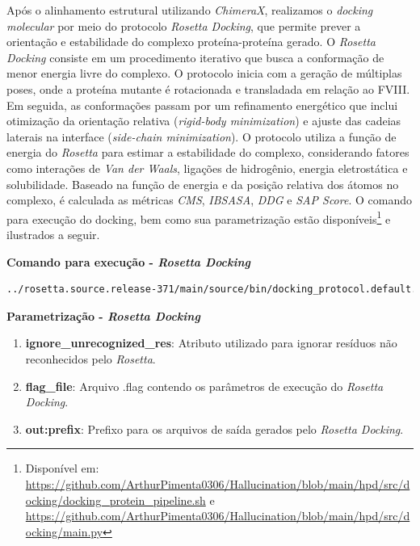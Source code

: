 Após o alinhamento estrutural utilizando \textit{ChimeraX}, realizamos o \textit{docking molecular} 
por meio do protocolo \textit{Rosetta Docking}, 
que permite prever a orientação e estabilidade do complexo proteína-proteína gerado.
O \textit{Rosetta Docking} consiste em um procedimento iterativo que busca a conformação de menor energia livre do complexo.
O protocolo inicia com a geração de múltiplas poses, onde a proteína mutante é rotacionada e transladada em relação ao FVIII.
Em seguida, as conformações passam por um refinamento energético que inclui otimização da 
orientação relativa (\textit{rigid-body minimization}) e ajuste das cadeias laterais na interface 
(\textit{side-chain minimization}). 
O protocolo utiliza a função de energia do \textit{Rosetta} para estimar a estabilidade do complexo,
considerando fatores como interações de \textit{Van der Waals}, 
ligações de hidrogênio, energia eletrostática e solubilidade.
Baseado na função de energia e da posição relativa dos átomos no complexo, 
é calculada as métricas \textit{CMS}, \textit{IBSASA}, 
\textit{DDG} e \textit{SAP Score}.
O comando para execução do docking, 
bem como sua parametrização 
estão disponíveis\footnote{Disponível em: \url{https://github.com/ArthurPimenta0306/Hallucination/blob/main/hpd/src/docking/docking_protein_pipeline.sh} e \url{https://github.com/ArthurPimenta0306/Hallucination/blob/main/hpd/src/docking/main.py}}
e ilustrados a seguir.

\textbf{Comando para execução - \textit{Rosetta Docking}}
\begin{lstlisting}[language=bash, breaklines=true, frame=single, backgroundcolor=\color{lightgray}]
  ../rosetta.source.release-371/main/source/bin/docking_protocol.default.macosclangrelease -ignore_unrecognized_res @flag_file -out:prefix process_1_
\end{lstlisting}

\textbf{Parametrização - \textit{Rosetta Docking}}
\begin{enumerate}
    \item \textbf{ignore\_unrecognized\_res}: Atributo utilizado para ignorar resíduos não reconhecidos pelo \textit{Rosetta}.
    \item \textbf{flag\_file}: Arquivo .flag contendo os parâmetros de execução do \textit{Rosetta Docking}.
    \item \textbf{out:prefix}: Prefixo para os arquivos de saída gerados pelo \textit{Rosetta Docking}.
\end{enumerate}

